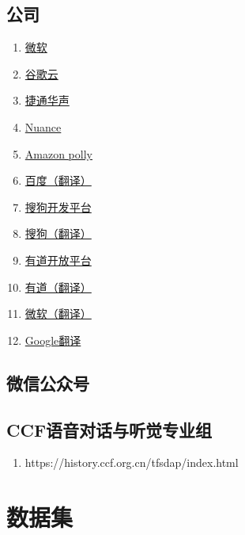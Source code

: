 \documentclass[cn,10pt,math=newtx,citestyle=gb7714-2015,bibstyle=gb7714-2015]{elegantbook}
\begin{document}
\subsection{公司}
\begin{enumerate}
  \item \href{https://azure.microsoft.com/en-us/services/cognitive-services/text-to-speech/#features}{微软}
  \item \href{https://cloud.google.com/text-to-speech/docs/voices?hl=zh-cn}{谷歌云}
  \item \href{https://www.aicloud.com/dev/ability/index.html?key=tts#ability-experience}{捷通华声}
  \item \href{https://www.nuance.com/omni-channel-customer-engagement/voice-and-ivr/text-to-speech.html#!}{Nuance}
  \item \href{https://aws.amazon.com/cn/polly/}{Amazon polly}
  \item \href{https://fanyi.baidu.com/}{百度（翻译）}
  \item \href{https://ai.sogou.com/product/audio_composition/}{搜狗开发平台}
  \item \href{https://fanyi.sogou.com/}{搜狗（翻译）}
  \item \href{https://ai.youdao.com/product-tts.s}{有道开放平台}
  \item \href{http://fanyi.youdao.com}{有道（翻译）}
  \item \href{https://cn.bing.com/translator}{微软（翻译）}
  \item \href{https://translate.google.cn/}{Google翻译}
\end{enumerate}

\subsection{微信公众号}

\subsection{CCF语音对话与听觉专业组}
\begin{enumerate}
  \item https://history.ccf.org.cn/tfsdap/index.html
\end{enumerate}

\section{数据集}
\end{document}
